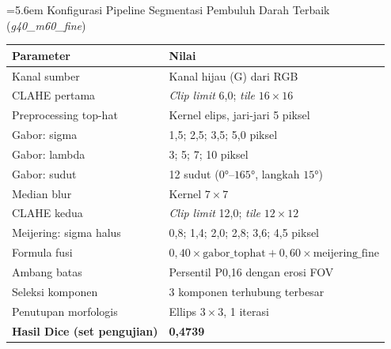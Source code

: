 \clearpage


\label{lamp:vessel_config}

\noindent\hangindent=5.6em
%
Konfigurasi Pipeline Segmentasi Pembuluh Darah Terbaik (\textit{g40\_m60\_fine})

\vspace{4pt}

\noindent
\begin{tabular}{l l}
  \toprule
  \textbf{Parameter} & \textbf{Nilai} \\
  \midrule
  Kanal sumber & Kanal hijau (G) dari RGB \\
  CLAHE pertama & \textit{Clip limit} 6,0; \textit{tile} $16 \times 16$ \\
  Preprocessing top-hat & Kernel elips, jari-jari 5 piksel \\
  Gabor: sigma & 1,5; 2,5; 3,5; 5,0 piksel \\
  Gabor: lambda & 3; 5; 7; 10 piksel \\
  Gabor: sudut & 12 sudut ($0°$--$165°$, langkah $15°$) \\
  Median blur & Kernel $7 \times 7$ \\
  CLAHE kedua & \textit{Clip limit} 12,0; \textit{tile} $12 \times 12$ \\
  Meijering: sigma halus & 0,8; 1,4; 2,0; 2,8; 3,6; 4,5 piksel \\
  Formula fusi & $0{,}40 \times \text{gabor\_tophat} + 0{,}60 \times \text{meijering\_fine}$ \\
  Ambang batas & Persentil P0,16 dengan erosi FOV \\
  Seleksi komponen & 3 komponen terhubung terbesar \\
  Penutupan morfologis & Ellips $3 \times 3$, 1 iterasi \\
  \midrule
  \textbf{Hasil Dice (set pengujian)} & \textbf{0,4739} \\
  \bottomrule
\end{tabular}

\clearpage


